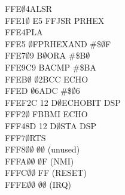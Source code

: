 \documentclass[letterpaper]{article}
\begin{document}
{\begin{tabbing}
FFE$\emptyset$\>4A\>\>LSR\>\\
FFE1$\emptyset$ E5 FF\>\>JSR PRHEX\\
FFE4\>\>PLA\\
FFE5 $\emptyset$F\>PRHEX\>AND \#\$$\emptyset$F\\
FFE7\>$\emptyset$9 B$\emptyset$\>\>ORA \#\$B$\emptyset$\\
FFE9\>C9 BA\>\>CMP \#\$BA\\
FFEB$\emptyset$ $\emptyset$2\>\>BCC ECHO\\
FFED $\emptyset$6\>\>ADC \#\$$\emptyset$6\\
FFEF\>2C 12 D$\emptyset$\>ECHO\>BIT DSP\\
FFF2$\emptyset$ FB\>\>BMI ECHO\\
FFF4\>8D 12 D$\emptyset$\>\>STA DSP\\
FFF7$\emptyset$\>\>RTS\\
FFF8\>$\emptyset\emptyset$ $\emptyset\emptyset$ (unused)\\
FFFA\>$\emptyset\emptyset$ $\emptyset$F (NMI)\\
FFFC\>$\emptyset\emptyset$ FF (RESET)\\
FFFE\>$\emptyset\emptyset$ $\emptyset\emptyset$ (IRQ)\\
\end{tabbing}
}
\end{document}
